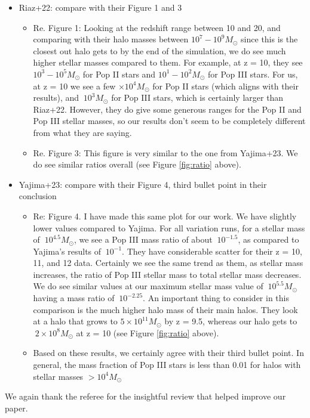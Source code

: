 \documentclass[11pt]{article}
\begin{document}
\begin{itemize}
    \item Riaz+22: compare with their Figure 1 and 3
    \begin{itemize}
        \item Re. Figure 1: Looking at the redshift range between 10 and 20, and comparing with their halo masses between $10^7 - 10^9 M_\odot$ since this is the closest out halo gets to by the end of the simulation, we do see much higher stellar masses compared to them. For example, at z = 10, they see $10^3 - 10^5 M_\odot$ for Pop II stars and $10^1 - 10^2 M_\odot$ for Pop III stars. For us, at z = 10 we see a few $\times 10^4 M_\odot$ for Pop II stars (which aligns with their results), and $~10^{3} M_{\odot}$ for Pop III stars, which is certainly larger than Riaz+22. However, they do give some generous ranges for the Pop II and Pop III stellar masses, so our results don't seem to be completely different from what they are saying.
        \item Re. Figure 3: This figure is very similar to the one from Yajima+23. We do see similar ratios overall (see Figure \ref{fig:ratio} above).
    \end{itemize}
    \item Yajima+23: compare with their Figure 4, third bullet point in their conclusion
    \begin{itemize}
        \item Re: Figure 4. I have made this same plot for our work. We have slightly lower values compared to Yajima. For all variation runs, for a stellar mass of $~10^{4.5} M_\odot$, we see a Pop III mass ratio of about $~10^{-1.5}$, as compared to Yajima's results of $~10^{-1}$. They have considerable scatter for their z = 10, 11, and 12 data. Certainly we see the same trend as them, as stellar mass increases, the ratio of Pop III stellar mass to total stellar mass decreases. We do see similar values at our maximum stellar mass value of $~10^{5.5} M_\odot$ having a mass ratio of $~10^{-2.25}$. An important thing to consider in this comparison is the much higher halo mass of their main halos. They look at a halo that grows to $5 \times 10^{11} M_\odot$ by z = 9.5, whereas our halo gets to $~2 \times 10^{8} M_\odot$ at z = 10 (see Figure \ref{fig:ratio} above).
        \item Based on these results, we certainly agree with their third bullet point. In general, the mass fraction of Pop III stars is less than 0.01 for halos with stellar masses $> 10^{4} M_\odot$ 
    \end{itemize}
\end{itemize}

We again thank the referee for the insightful review that helped
improve our paper.



\end{document}
